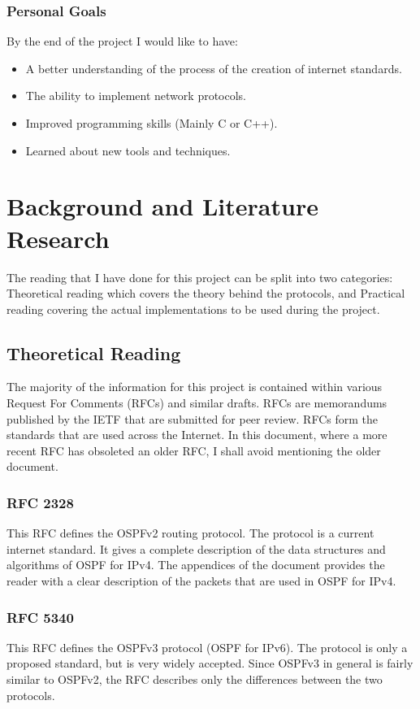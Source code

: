 \documentclass[12pt]{report}
\begin{document}
\subsection{Personal Goals}
By the end of the project I would like to have:

\begin{itemize}
	\item A better understanding of the process of the creation of internet
	standards.
	\item The ability to implement network protocols. 
	\item Improved programming skills (Mainly C or C++).
	\item Learned about new tools and techniques.
\end{itemize}

\chapter{Background and Literature Research}
The reading that I have done for this project can be split into two categories:
Theoretical reading which covers the theory behind the protocols, and Practical 
reading covering the actual implementations to be used during the project.

\section{Theoretical Reading}
The majority of the information for this project is contained within various
Request For Comments (RFCs)  and similar
drafts. RFCs are memorandums published by the IETF that are submitted for peer
review. RFCs form the standards that are used across the Internet. In this
document, where a more recent RFC has obsoleted an older RFC, I shall avoid
mentioning the older document. 

\subsection{RFC 2328} 
This RFC defines the OSPFv2 routing protocol. The protocol is a current internet
standard. It gives a complete description of the data structures and algorithms
of OSPF for IPv4. The appendices of the document provides the reader with a
clear description of the packets that are used in OSPF for IPv4.

\subsection{RFC 5340}
This RFC defines the OSPFv3 protocol (OSPF for IPv6). The protocol is only a
proposed standard, but is very widely accepted.  Since OSPFv3 in general is
fairly similar to OSPFv2, the RFC describes only the differences between the two
protocols. 
\end{document}
